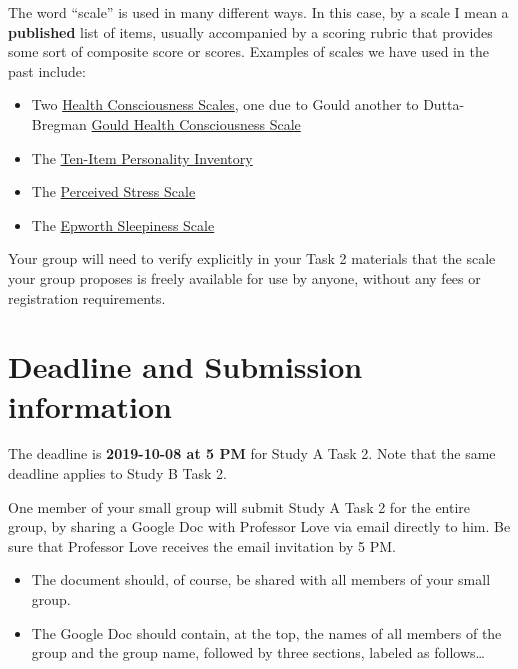 \documentclass[]{book}
\providecommand{\tightlist}{%
  \setlength{\itemsep}{0pt}\setlength{\parskip}{0pt}}
\begin{document}
The word ``scale'' is used in many different ways. In this case, by a scale I mean a \textbf{published} list of items, usually accompanied by a scoring rubric that provides some sort of composite score or scores. Examples of scales we have used in the past include:

\begin{itemize}
\tightlist
\item
  Two \href{https://chirr.nlm.nih.gov/health-orientation.php}{Health Consciousness Scales}, one due to Gould another to Dutta-Bregman \href{https://chirr.nlm.nih.gov/health-orientation.php}{Gould Health Consciousness Scale}
\item
  The \href{https://gosling.psy.utexas.edu/scales-weve-developed/ten-item-personality-measure-tipi/ten-item-personality-inventory-tipi/}{Ten-Item Personality Inventory}
\item
  The \href{https://das.nh.gov/wellness/Docs/Percieved\%20Stress\%20Scale.pdf}{Perceived Stress Scale}
\item
  The \href{https://www.sleepapnea.org/assets/files/pdf/ESS\%20PDF\%201990-97.pdf}{Epworth Sleepiness Scale}
\end{itemize}

Your group will need to verify explicitly in your Task 2 materials that the scale your group proposes is freely available for use by anyone, without any fees or registration requirements.

\hypertarget{deadline-and-submission-information-1}{%
\section{Deadline and Submission information}\label{deadline-and-submission-information-1}}

The deadline is \textbf{2019-10-08 at 5 PM} for Study A Task 2. Note that the same deadline applies to Study B Task 2.

One member of your small group will submit Study A Task 2 for the entire group, by sharing a Google Doc with Professor Love via email directly to him. Be sure that Professor Love receives the email invitation by 5 PM.

\begin{itemize}
\tightlist
\item
  The document should, of course, be shared with all members of your small group.
\item
  The Google Doc should contain, at the top, the names of all members of the group and the group name, followed by three sections, labeled as follows\ldots{}
\end{itemize}
\end{document}
